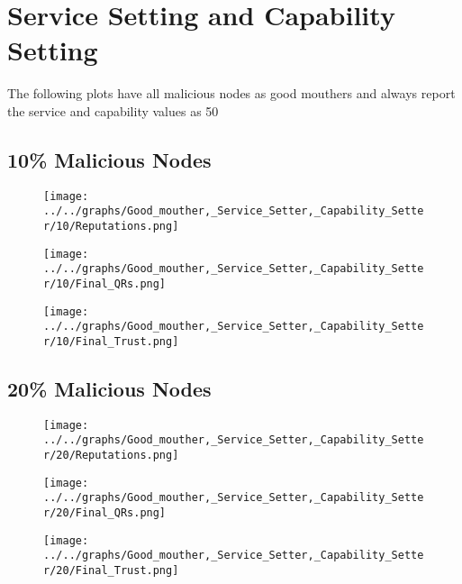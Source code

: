 \section*{Service Setting and Capability Setting}
The following plots have all malicious nodes as good mouthers and always
report the service and capability values as 50
\\
\begin{minipage}[t]{0.49\columnwidth}
\subsection*{10\% Malicious Nodes}
    \begin{figure}[H]
        \centering
        \texttt{[image: ../../graphs/Good\_mouther,\_Service\_Setter,\_Capability\_Setter/10/Reputations.png]}
    \end{figure}
    \begin{figure}[H]
        \centering
        \texttt{[image: ../../graphs/Good\_mouther,\_Service\_Setter,\_Capability\_Setter/10/Final\_QRs.png]}
    \end{figure}
\end{minipage}
\begin{minipage}[t]{0.49\columnwidth}
    \begin{figure}[H]
        \centering
        \texttt{[image: ../../graphs/Good\_mouther,\_Service\_Setter,\_Capability\_Setter/10/Final\_Trust.png]}
    \end{figure}
\end{minipage}

\begin{minipage}[t]{0.49\columnwidth}
\subsection*{20\% Malicious Nodes}
    \begin{figure}[H]
        \centering
        \texttt{[image: ../../graphs/Good\_mouther,\_Service\_Setter,\_Capability\_Setter/20/Reputations.png]}
    \end{figure}
    \begin{figure}[H]
        \centering
        \texttt{[image: ../../graphs/Good\_mouther,\_Service\_Setter,\_Capability\_Setter/20/Final\_QRs.png]}
    \end{figure}
\end{minipage}
\begin{minipage}[t]{0.49\columnwidth}
    \begin{figure}[H]
        \centering
        \texttt{[image: ../../graphs/Good\_mouther,\_Service\_Setter,\_Capability\_Setter/20/Final\_Trust.png]}
    \end{figure}
\end{minipage}

